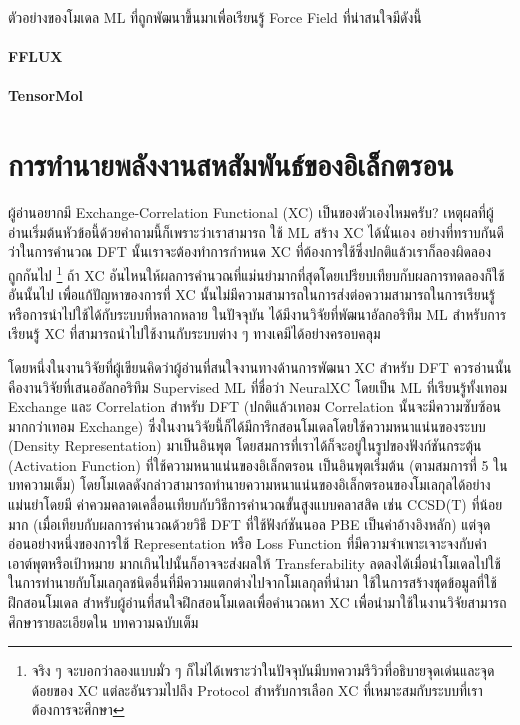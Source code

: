 ตัวอย่างของโมเดล ML ที่ถูกพัฒนาขึ้นมาเพื่อเรียนรู้ Force Field ที่น่าสนใจมีดังนี้

\paragraph{FFLUX}\autocite{hughes2019}

\paragraph{TensorMol}\autocite{yao2018}

\section{การทำนายพลังงานสหสัมพันธ์ของอิเล็กตรอน}
\label{sec:pred_corre_ener}

ผู้อ่านอยากมี Exchange-Correlation Functional (XC) เป็นของตัวเองไหมครับ? เหตุผลที่ผู้อ่านเริ่มต้นหัวข้อนี้ด้วยคำถามนี้ก็เพราะว่าเราสามารถ%
ใช้ ML สร้าง XC ได้นั่นเอง อย่างที่ทราบกันดีว่าในการคำนวณ DFT นั้นเราจะต้องทำการกำหนด XC ที่ต้องการใช้ซึ่งปกติแล้วเราก็ลองผิดลองถูกกันไป%
\footnote{จริง ๆ จะบอกว่าลองแบบมั่ว ๆ ก็ไม่ได้เพราะว่าในปัจจุบันมีบทความรีวิวที่อธิบายจุดเด่นและจุดด้อยของ XC แต่ละอันรวมไปถึง Protocol 
สำหรับการเลือก XC ที่เหมาะสมกับระบบที่เราต้องการจะศึกษา} ถ้า XC อันไหนให้ผลการคำนวณที่แม่นยำมากที่สุดโดยเปรียบเทียบกับผลการทดลองก็ใช้%
อันนั้นไป เพื่อแก้ปัญหาของการที่ XC นั้นไม่มีความสามารถในการส่งต่อความสามารถในการเรียนรู้หรือการนำไปใช้ได้กับระบบที่หลากหลาย ในปัจจุบัน%
ได้มีงานวิจัยที่พัฒนาอัลกอริทึม ML สำหรับการเรียนรู้ XC ที่สามารถนำไปใช้งานกับระบบต่าง ๆ ทางเคมีได้อย่างครอบคลุม%
\autocite{mcdonagh2018,nudejima2019,dick2020,han2021} 

โดยหนึ่งในงานวิจัยที่ผู้เขียนคิดว่าผู้อ่านที่สนใจงานทางด้านการพัฒนา XC สำหรับ DFT ควรอ่านนั้นคืองานวิจัยที่เสนออัลกอริทึม Supervised ML 
ที่ชื่อว่า NeuralXC\autocite{dick2020} โดยเป็น ML ที่เรียนรู้ทั้งเทอม Exchange และ Correlation สำหรับ DFT (ปกติแล้วเทอม 
Correlation นั้นจะมีความซับซ้อนมากกว่าเทอม Exchange) ซึ่งในงานวิจัยนี้ก็ได้มีการึกสอนโมเดลโดยใช้ความหนาแน่นของระบบ (Density 
Representation) มาเป็นอินพุต โดยสมการที่เราได้ก็จะอยู่ในรูปของฟังก์ชันกระตุ้น (Activation Function) ที่ใช้ความหนาแน่นของอิเล็กตรอน%
เป็นอินพุตเริ่มต้น (ตามสมการที่ 5 ในบทความเต็ม) โดยโมเดลดังกล่าวสามารถทำนายความหนาแน่นของอิเล็กตรอนของโมเลกุลได้อย่างแม่นยำโดยมี%
ค่าควมคลาดเคลื่อนเทียบกับวิธีการคำนวณขั้นสูงแบบคลาสสิค เช่น CCSD(T) ที่น้อยมาก (เมื่อเทียบกับผลการคำนวณด้วยวิธี DFT ที่ใช้ฟังก์ชันนอล PBE 
เป็นค่าอ้างอิงหลัก) แต่จุดอ่อนอย่างหนึ่งของการใช้ Representation หรือ Loss Function ที่มีความจำเพาะเจาะจงกับค่าเอาต์พุตหรือเป้าหมาย%
มากเกินไปนั้นก็อาจจะส่งผลให้ Transferability ลดลงได้เมื่อนำโมเดลไปใช้ในการทำนายกับโมเลกุลชนิดอื่นที่มีความแตกต่างไปจากโมเลกุลที่นำมา%
ใช้ในการสร้างชุดข้อมูลที่ใช้ฝึกสอนโมเดล สำหรับผู้อ่านที่สนใจฝึกสอนโมเดลเพื่อคำนวณหา XC เพื่อนำมาใช้ในงานวิจัยสามารถศึกษารายละเอียดใน%
บทความฉบับเต็ม

